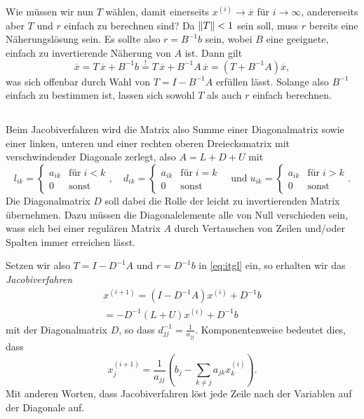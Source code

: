 Wie müssen wir nun $T$ wählen, damit einerseits $x^{(i)}\to \overline{x}$
für $i\to\infty$, andererseits aber $T$ und $r$ einfach zu berechnen
sind? Da $\left\lVert{T}\right\rVert < 1$ sein soll, muss $r$ bereits eine
Näherungslösung sein. Es sollte also $r = B^{-1}b$ sein, wobei $B$
eine geeignete, einfach zu invertierende Näherung von $A$ ist. Dann
gilt
\begin{equation}
  \overline{x} = T\,\overline{x} +
  B^{-1}b
  \stackrel{!}{=} T\,\overline{x} +
  B^{-1}A\,\overline{x}
  = \left(T + B^{-1}A\right)\overline{x},
\end{equation}
was sich offenbar durch Wahl von $T = I - B^{-1}A$ erfüllen
lässt. Solange also $B^{-1}$ einfach zu bestimmen ist, lassen sich
sowohl $T$ als auch $r$ einfach berechnen.

\subsection{}

Beim Jacobiverfahren wird die Matrix also Summe einer Diagonalmatrix
sowie einer linken, unteren
und einer rechten oberen Dreiecksmatrix mit verschwindender Diagonale
zerlegt, also $A = L + D + U$ mit
\begin{equation}
  l_{ik}=
  \begin{cases}
    a_{ik} & \text{für}\; i<k\\
    0 & \text{sonst}
  \end{cases},\quad
  d_{ik} =
  \begin{cases}
    a_{ik} & \text{für}\; i=k\\
    0 & \text{sonst}
  \end{cases}\quad\text{und}\;
  u_{ik} =
  \begin{cases}
    a_{ik} & \text{für}\; i>k\\
    0 & \text{sonst}
  \end{cases}.
\end{equation}
Die Diagonalmatrix $D$ soll dabei die Rolle der leicht zu
invertierenden Matrix übernehmen. Dazu müssen die Diagonalelemente
alle von Null verschieden sein, wass sich bei einer regulären Matrix
$A$ durch Vertauschen von Zeilen und/oder Spalten immer erreichen
lässt.

Setzen wir also $T=I-D^{-1}A$ und $r=D^{-1}b$ in \eqref{eq:itgl} ein,
so erhalten wir das \emph{Jacobiverfahren}
\begin{align}
  x^{(i+1)} = \left(I - D^{-1}A\right)x^{(i)} + D^{-1}b\nonumber\\
  = -D^{-1}\left(L + U\right)x^{(i)} + D^{-1}b
\end{align}
mit der Diagonalmatrix $D$, so dass $d^{-1}_{jj} =
\frac{1}{a_{jj}}$. Komponentenweise bedeutet dies, dass
\begin{equation}
  \label{eq:jacobicomp}
  x_j^{(i+1)} = \frac{1}{a_{jj}}\left(b_j - \sum_{k\neq j} a_{jk}x_k^{(i)}\right).
\end{equation}
Mit anderen Worten, dass Jacobiverfahren löst jede Zeile nach der
Variablen auf der Diagonale auf.

